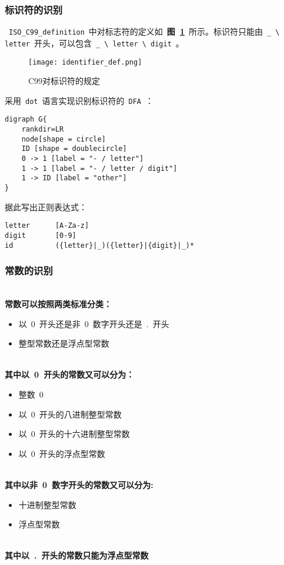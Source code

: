 \documentclass[lang=cn,11pt,a4paper]{paper}
\begin{document}
\subsubsection{标识符的识别}

\ \lstinline{ISO_C99_definition}\ 中对标志符的定义如\ \textbf{图\ \ref{fig:C99对标识符的规定}}\ 所示。标识符只能由\ \lstinline{_ \ letter}\ 开头，可以包含\ \lstinline{_ \ letter \ digit}\ 。

\begin{figure}[!htb]
    \centering
    \texttt{[image: identifier\_def.png]}
    \caption{C99对标识符的规定}
    \label{fig:C99对标识符的规定}
\end{figure}

采用\ \lstinline{dot}\ 语言实现识别标识符的\ \lstinline{DFA}\ ：

\begin{lstlisting}
digraph G{
    rankdir=LR
    node[shape = circle]
    ID [shape = doublecircle]
    0 -> 1 [label = "- / letter"]
    1 -> 1 [label = "- / letter / digit"]
    1 -> ID [label = "other"]
}
\end{lstlisting}

据此写出正则表达式：

\begin{lstlisting}
letter    	[A-Za-z]
digit     	[0-9]
id        	({letter}|_)({letter}|{digit}|_)*
\end{lstlisting}

\subsubsection{常数的识别}
~\\
\textbf{常数可以按照两类标准分类：}
\begin{itemize}
    \item 以\ 0\ 开头还是非\ 0\ 数字开头还是\ .\ 开头
    \item 整型常数还是浮点型常数
\end{itemize}
~\\
\textbf{其中以\ 0\ 开头的常数又可以分为：}
\begin{itemize}
    \item 整数\ 0
    \item 以\ 0\ 开头的八进制整型常数
    \item 以\ 0\ 开头的十六进制整型常数
    \item 以\ 0\ 开头的浮点型常数
\end{itemize}
~\\
\textbf{其中以非\ 0\ 数字开头的常数又可以分为:}
\begin{itemize}
    \item 十进制整型常数
    \item 浮点型常数
\end{itemize}
~\\
\textbf{其中以\ .\ 开头的常数只能为浮点型常数}
\end{document}
